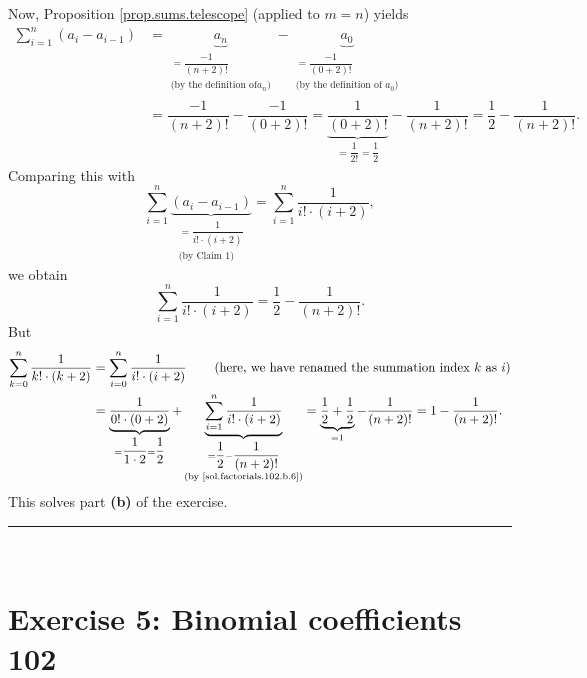 \documentclass[paper=a4, fontsize=12pt]{scrartcl}%
\let\sumnonlimits\sum
\renewcommand{\sum}{\sumnonlimits\limits}
\theoremstyle{plainsl}
\theoremstyle{definition}
\theoremstyle{remark}
\begin{document}
Now, Proposition \ref{prop.sums.telescope} (applied to $m=n$) yields%
\begin{align*}
\sum_{i=1}^{n}\left(  a_{i}-a_{i-1}\right)   &  =\underbrace{a_{n}%
}_{\substack{=\dfrac{-1}{\left(  n+2\right)  !}\\\text{(by the definition of
}a_{n}\text{)}}}-\underbrace{a_{0}}_{\substack{=\dfrac{-1}{\left(  0+2\right)
!}\\\text{(by the definition of }a_{0}\text{)}}}\\
&  =\dfrac{-1}{\left(  n+2\right)  !}-\dfrac{-1}{\left(  0+2\right)
!}=\underbrace{\dfrac{1}{\left(  0+2\right)  !}}_{=\dfrac{1}{2!}=\dfrac{1}{2}%
}-\dfrac{1}{\left(  n+2\right)  !}=\dfrac{1}{2}-\dfrac{1}{\left(  n+2\right)
!}.
\end{align*}
Comparing this with%
\[
\sum_{i=1}^{n}\underbrace{\left(  a_{i}-a_{i-1}\right)  }_{\substack{=\dfrac
{1}{i!\cdot\left(  i+2\right)  }\\\text{(by Claim 1)}}}=\sum_{i=1}^{n}%
\dfrac{1}{i!\cdot\left(  i+2\right)  },
\]
we obtain%
\begin{equation}
\sum_{i=1}^{n}\dfrac{1}{i!\cdot\left(  i+2\right)  }=\dfrac{1}{2}-\dfrac
{1}{\left(  n+2\right)  !}. \label{sol.factorials.102.b.6}%
\end{equation}
But%
\begin{align*}
\sum_{k=0}^{n}\dfrac{1}{k!\cdot\left(  k+2\right)  }  &  =\sum_{i=0}^{n}%
\dfrac{1}{i!\cdot\left(  i+2\right)  }\qquad\left(  \text{here, we have
renamed the summation index }k\text{ as }i\right) \\
&  =\underbrace{\dfrac{1}{0!\cdot\left(  0+2\right)  }}_{=\dfrac{1}{1\cdot
2}=\dfrac{1}{2}}+\underbrace{\sum_{i=1}^{n}\dfrac{1}{i!\cdot\left(
i+2\right)  }}_{\substack{=\dfrac{1}{2}-\dfrac{1}{\left(  n+2\right)
!}\\\text{(by \eqref{sol.factorials.102.b.6})}}}=\underbrace{\dfrac{1}%
{2}+\dfrac{1}{2}}_{=1}-\dfrac{1}{\left(  n+2\right)  !}=1-\dfrac{1}{\left(
n+2\right)  !}.
\end{align*}
This solves part \textbf{(b)} of the exercise.

\rule{\linewidth}{0.3pt} \\[0.4cm]

\section{Exercise 5: Binomial coefficients 102}
\end{document}
